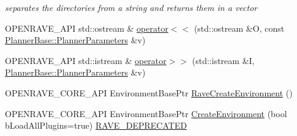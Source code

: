 \begin{DoxyCompactItemize}
\begin{DoxyCompactList}\small\item\em separates the directories from a string and returns them in a vector \item\end{DoxyCompactList}\item 
OPENRAVE\_\-API std::ostream \& \hyperlink{namespaceOpenRAVE_ae99951462c88a655511abbd361bcf841}{operator$<$$<$} (std::ostream \&O, const \hyperlink{classOpenRAVE_1_1PlannerBase_1_1PlannerParameters}{PlannerBase::PlannerParameters} \&v)
\item 
OPENRAVE\_\-API std::istream \& \hyperlink{namespaceOpenRAVE_a06be8afa87a225a4a6cdc0a5c2de150a}{operator$>$$>$} (std::istream \&I, \hyperlink{classOpenRAVE_1_1PlannerBase_1_1PlannerParameters}{PlannerBase::PlannerParameters} \&v)
\item 
OPENRAVE\_\-CORE\_\-API EnvironmentBasePtr \hyperlink{namespaceOpenRAVE_aec9c3dd6a1f2908a1eb84ca59243e00a}{RaveCreateEnvironment} ()
\item 
OPENRAVE\_\-CORE\_\-API EnvironmentBasePtr \hyperlink{namespaceOpenRAVE_ae3bd9d884ea7720a63d49b6212d13f42}{CreateEnvironment} (bool bLoadAllPlugins=true) \hyperlink{namespaceOpenRAVE_af23fc4c2c72950a8c02f38ef71680bc6}{RAVE\_\-DEPRECATED}
\end{DoxyCompactItemize}
